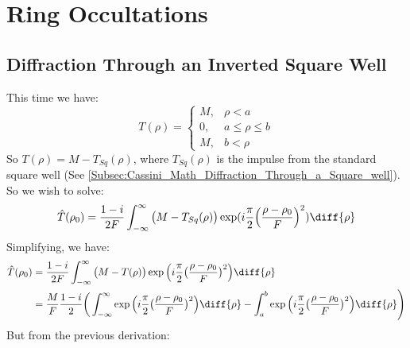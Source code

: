 \documentclass[crop=false,class=article,oneside]{standalone}
\begin{document}
    \ifx\ifresearchnotesosthemathematicsofcassini\undefined
        \section*{Ring Occultations}
        \setcounter{section}{1}
        \renewcommand\thesubfigure{%
            \arabic{section}.\arabic{figure}.\arabic{subfigure}%
        }
    \fi
    \subsection{Diffraction Through an Inverted Square Well}
        This time we have:
        \begin{equation*}
            T(\rho)=
            \begin{cases}
                M,&\rho<a\\
                0,&a\leq\rho\leq{b}\\
                M,&b<\rho
            \end{cases}    
        \end{equation*}
        So $T(\rho) = M - T_{Sq}(\rho)$,
        where $T_{Sq}(\rho)$ is the impulse from the standard
        square well (See
        \ref{Subsec:Cassini_Math_Diffraction_Through_a_Square_well}).
        So we wish to solve:
        \begin{equation*}
            \hat{T}(\rho_{0})=
            \frac{1-i}{2F}\int_{-\infty}^{\infty}
            \big(M-T_{Sq}(\rho)\big)
            \exp(i\frac{\pi}{2}\Big(\frac{\rho-\rho_{0}}{F}\Big)^{2})
            \diff{\rho}
        \end{equation*}
            Simplifying, we have:
            \begin{align*}
                \hat{T}(\rho_{0})
                &=\frac{1-i}{2F}\int_{-\infty}^{\infty}
                \big(M-T(\rho)\big)
                \exp\Big(i\frac{\pi}{2}
                    \big(\frac{\rho-\rho_0}{F}\big)^{2}\Big)
                \diff{\rho}\\
                &=\frac{M}{F}\frac{1-i}{2}
                \bigg(\int_{-\infty}^{\infty}
                \exp\Big(i\frac{\pi}{2}
                    \big(\frac{\rho-\rho_0}{F}\big)^2\Big)
                \diff{\rho}-
                \int_{a}^{b}
                \exp\Big(i\frac{\pi}{2}
                    \big(\frac{\rho-\rho_0}{F}\big)^2\Big)
                \diff{\rho}\Bigg)\\
            \end{align*}
            But from the previous derivation:
\end{document}
